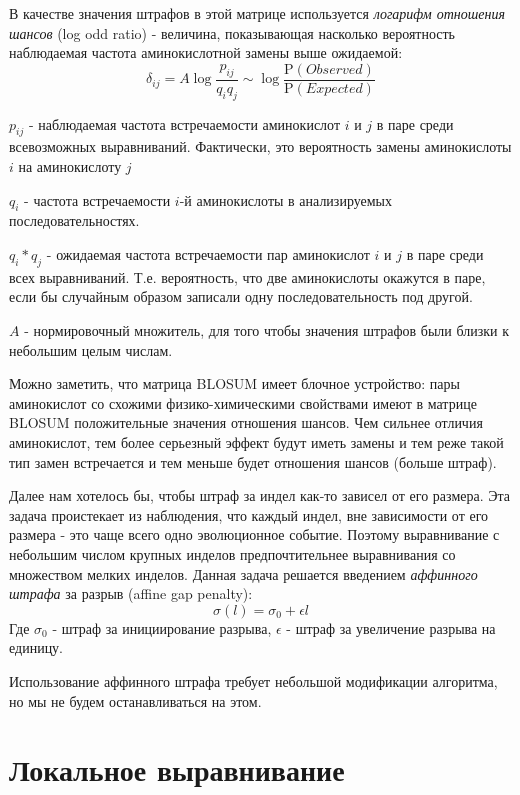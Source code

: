 \documentclass[letterpaper, 11pt]{article}
\newcommand{\prob}{\mathrm{P}}
\begin{document}
В качестве значения штрафов в этой матрице используется \textit{логарифм отношения шансов} (log odd ratio) - величина, показывающая насколько вероятность наблюдаемая частота аминокислотной замены выше ожидаемой:
$$\delta_{ij}=A\log{\frac{p_{ij}}{q_i q_j}} \sim \log \frac{\prob (Observed)}{\prob (Expected)}$$

$p_{ij}$ - наблюдаемая частота встречаемости аминокислот $i$ и $j$  в паре среди всевозможных выравниваний. Фактически, это вероятность замены аминокислоты $i$ на аминокислоту $j$

$q_i$ - частота встречаемости $i$-й аминокислоты в анализируемых последовательностях.

$q_i*q_j$ - ожидаемая частота встречаемости пар аминокислот $i$ и $j$  в паре среди всех выравниваний. Т.е. вероятность, что две аминокислоты окажутся в паре, если бы случайным образом записали одну последовательность под другой.

$A$ - нормировочный множитель, для того чтобы значения штрафов были близки к небольшим целым числам.

Можно заметить, что матрица BLOSUM имеет блочное устройство: пары аминокислот со схожими физико-химическими свойствами имеют в матрице BLOSUM положительные значения отношения шансов. Чем сильнее отличия аминокислот, тем более серьезный эффект будут иметь замены и тем реже такой тип замен встречается и тем меньше будет отношения шансов (больше штраф).

Далее нам хотелось бы, чтобы штраф за индел как-то зависел от его размера. Эта задача проистекает из наблюдения, что каждый индел, вне зависимости от его размера - это чаще всего одно эволюционное событие. Поэтому выравнивание с небольшим числом крупных инделов предпочтительнее выравнивания со множеством мелких инделов. Данная задача решается введением \textit{аффинного штрафа} за разрыв (affine gap penalty): $$\sigma(l)=\sigma_0+\epsilon l$$
Где $\sigma_0$ - штраф за инициирование разрыва, $\epsilon$ - штраф за увеличение разрыва на единицу.

Использование аффинного штрафа требует небольшой модификации алгоритма, но мы не будем останавливаться на этом.

\section{Локальное выравнивание}
\end{document}

